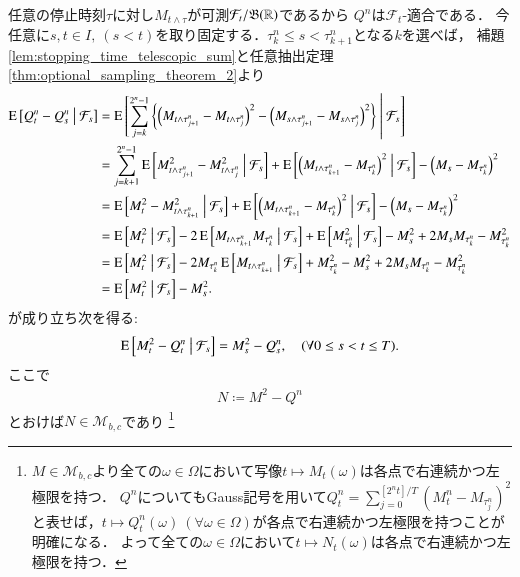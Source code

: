 	\begin{prf}
		任意の停止時刻$\tau$に対し$M_{t \wedge \tau}$が可測$\mathcal{F}_t/\mathfrak{B}(\mathbb{R})$であるから
		$Q^n$は$\mathcal{F}_t$-適合である．
		今任意に$s,t \in I,\ (s < t)$を取り固定する．$\tau_k^n \leq s < \tau_{k+1}^n$となる$k$を選べば，
		補題\ref{lem:stopping_time_telescopic_sum}と任意抽出定理\ref{thm:optional_sampling_theorem_2}より
		\begin{align}
			\operatorname{E} \left[ Q_t^n - Q_s^n \ \middle|\ \mathcal{F}_s \right] 
			&= \operatorname{E} \left[ \sum_{j=k}^{2^n-1}\left\{ \left( M_{t\wedge\tau_{j+1}^n} - M_{t\wedge\tau_j^n} \right)^2 - \left( M_{s\wedge\tau_{j+1}^n} - M_{s\wedge\tau_j^n} \right)^2 \right\} \ \middle|\ \mathcal{F}_s \right] \\
			&= \sum_{j=k+1}^{2^n-1} \operatorname{E} \left[  M_{t\wedge\tau_{j+1}^n}^2 - M_{t\wedge\tau_j^n}^2 \ \middle|\ \mathcal{F}_s \right]
				+ \operatorname{E} \left[ \left( M_{t\wedge\tau_{k+1}^n} - M_{\tau_k^n} \right)^2 \ \middle|\ \mathcal{F}_s \right] - \left( M_s - M_{\tau_k^n} \right)^2 \\
			&= \operatorname{E} \left[  M_t^2 - M_{t\wedge\tau_{k+1}^n}^2 \ \middle|\ \mathcal{F}_s \right] + \operatorname{E} \left[ \left( M_{t\wedge\tau_{k+1}^n} - M_{\tau_k^n} \right)^2 \ \middle|\ \mathcal{F}_s \right] - \left( M_s - M_{\tau_k^n} \right)^2 \\
			&= \operatorname{E} \left[ M_t^2 \ \middle|\ \mathcal{F}_s \right] - 2\operatorname{E} \left[ M_{t\wedge\tau_{k+1}^n}M_{\tau_k^n} \ \middle|\ \mathcal{F}_s \right] + \operatorname{E} \left[ M_{\tau_k^n}^2 \ \middle|\ \mathcal{F}_s \right] - M_s^2 + 2M_sM_{\tau_k^n} - M_{\tau_k^n}^2 \\
			&= \operatorname{E} \left[ M_t^2 \ \middle|\ \mathcal{F}_s \right] - 2M_{\tau_k^n}\operatorname{E} \left[ M_{t\wedge\tau_{k+1}^n} \ \middle|\ \mathcal{F}_s \right] + M_{\tau_k^n}^2 - M_s^2 + 2M_sM_{\tau_k^n} - M_{\tau_k^n}^2 \\
			&= \operatorname{E} \left[ M_t^2 \ \middle|\ \mathcal{F}_s \right] - M_s^2.
		\end{align}
		が成り立ち次を得る:
		\begin{align}
			\operatorname{E} \left[ M_t^2 - Q_t^n \ \middle|\ \mathcal{F}_s \right] = M_s^2 - Q_s^n, \quad (\forall 0 \leq s < t \leq T).
			\label{eq:lem_quadratic_variation_1}
		\end{align}
		ここで
		\begin{align}
			N \coloneqq M^2 - Q^n
		\end{align}
		とおけば$N \in \mathcal{M}_{b,c}$であり
		\footnote{
			$M \in \mathcal{M}_{b,c}$より全ての$\omega \in \Omega$において写像$t \longmapsto M_t(\omega)$は各点で右連続かつ左極限を持つ．
			$Q^n$についてもGauss記号を用いて$Q_t^n = \sum_{j=0}^{[2^nt]/T} \left( M_t^n - M_{\tau_j^n} \right)^2$
			と表せば，$t \longmapsto Q_t^n(\omega)\ (\forall \omega \in \Omega)$が各点で右連続かつ左極限を持つことが明確になる．
			よって全ての$\omega \in \Omega$において$t \longmapsto N_t(\omega)$は各点で右連続かつ左極限を持つ．
}
\end{prf}
